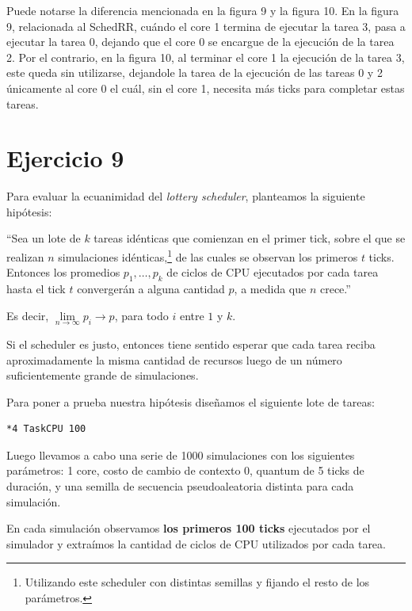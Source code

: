 \documentclass[a4paper,10pt,twoside]{article}
\begin{document}
Puede notarse la diferencia mencionada en la figura 9 y la figura 10. En la figura 9, relacionada al SchedRR, cuándo el core 1 termina de ejecutar la tarea 3, pasa a ejecutar la tarea 0, dejando que el core 0 se encargue de la ejecución de la tarea 2. Por el contrario, en la figura 10, al terminar el core 1 la ejecución de la tarea 3, este queda sin utilizarse, dejandole la tarea de la ejecución de las tareas 0 y 2 únicamente al core 0 el cuál, sin el core 1, necesita más ticks para completar estas tareas.



\section{Ejercicio 9}

Para evaluar la ecuanimidad del \textit{lottery scheduler}, planteamos la siguiente hipótesis:

``Sea un lote de $k$ tareas idénticas que comienzan en el primer tick, sobre el que se realizan $n$ simulaciones idénticas,\footnote{Utilizando este scheduler con distintas semillas y fijando el resto de los parámetros.} de las cuales se observan los primeros $t$ ticks. Entonces los promedios $p_1, \ldots, p_k$ de ciclos de CPU ejecutados por cada tarea hasta el tick $t$ convergerán a alguna cantidad $p$, a medida que $n$ crece.''

Es decir, $\lim \limits_{n \to \infty} p_i \to p$, para todo $i$ entre $1$ y $k$.

Si el scheduler es justo, entonces tiene sentido esperar que cada tarea reciba aproximadamente la misma cantidad de recursos luego de un número suficientemente grande de simulaciones. 

Para poner a prueba nuestra hipótesis diseñamos el siguiente lote de tareas:

\begin{verbatim}
*4 TaskCPU 100
\end{verbatim}

Luego llevamos a cabo una serie de 1000 simulaciones con los siguientes parámetros: 1 core, costo de cambio de contexto 0, quantum de 5 ticks de duración, y una semilla de secuencia pseudoaleatoria distinta para cada simulación.

En cada simulación observamos \textbf{los primeros 100 ticks} ejecutados por el simulador y extraímos la cantidad de ciclos de CPU utilizados por cada tarea.
\end{document}
